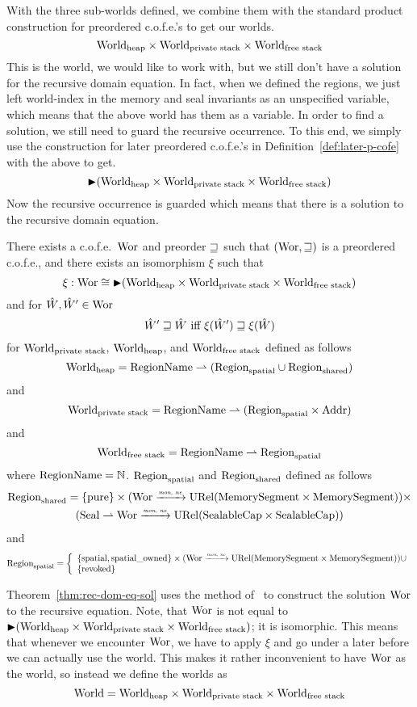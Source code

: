 \begin{jversion}
With the three sub-worlds defined, we combine them with the standard product construction for preordered c.o.f.e.'s to get our worlds.
\[
  \mathrm{World}_\mathrm{heap} \times \mathrm{World}_\text{private stack} \times \mathrm{World}_\text{free stack}
\]
This is the world, we would like to work with, but we still don't have a solution for the recursive domain equation.
In fact, when we defined the regions, we just left world-index in the memory and seal invariants as an unspecified variable, which means that the above world has them as a variable.
In order to find a solution, we still need to guard the recursive occurrence.
To this end, we simply use the construction for later preordered c.o.f.e.'s in Definition~\ref{def:later-p-cofe} with the above to get.
\[
  \mathop{\blacktriangleright} (\mathrm{World}_\mathrm{heap} \times \mathrm{World}_\text{private stack} \times \mathrm{World}_\text{free stack})
\]
Now the recursive occurrence is guarded which means that there is a solution to the recursive domain equation.
\begin{theorem}
  \label{thm:rec-dom-eq-sol}
  There exists a c.o.f.e.\ $\mathrm{Wor}$ and preorder $\sqsupseteq$ such that $(\mathrm{Wor},\sqsupseteq)$ is a preordered c.o.f.e., and there exists an isomorphism $\xi$ such that
  \[
    \xi : \mathrm{Wor} \cong \mathop{\blacktriangleright} (\mathrm{World}_\mathrm{heap} \times \mathrm{World}_\text{private stack} \times \mathrm{World}_\text{free stack})
  \]
  and for $\hat{W},\hat{W}' \in \mathrm{Wor}$
  \[
    \hat{W}' \sqsupseteq \hat{W} \text{ iff } \xi(\hat{W}') \sqsupseteq \xi(\hat{W})
  \]
  for $\mathrm{World}_\text{private stack}$, $\mathrm{World}_\mathrm{heap}$, and $\mathrm{World}_\text{free stack}$ defined as follows
\[
  \mathrm{World}_\mathrm{heap} = \mathrm{RegionName} \rightharpoonup (\mathrm{Region}_\mathrm{spatial} \cup \mathrm{Region}_\mathrm{shared})
\]
and
\[
  \mathrm{World}_\text{private stack} = \mathrm{RegionName} \rightharpoonup (\mathrm{Region}_\mathrm{spatial} \times \mathrm{Addr})
\]
and
\[
  \mathrm{World}_\text{free stack} = \mathrm{RegionName} \rightharpoonup \mathrm{Region}_\mathrm{spatial}
\]
where $\mathrm{RegionName} = \mathbb{N}$. $\mathrm{Region}_\mathrm{spatial}$ and $\mathrm{Region}_\mathrm{shared}$ defined as follows
\begin{multline*}
  \mathrm{Region}_\mathrm{shared} = 
  \{\mathrm{pure} \} \times (\mathrm{Wor} \xrightarrow{\textit{\tiny{mon, ne}}} \mathrm{URel}(\mathrm{MemorySegment}\times\mathrm{MemorySegment})) \times \\
  (\mathrm{Seal} \rightharpoonup \mathrm{Wor} \xrightarrow{\textit{\tiny{mon, ne}}} \mathrm{URel}(\mathrm{SealableCap}\times\mathrm{SealableCap}))
\end{multline*}
and
\[
  \mathrm{Region}_\mathrm{spatial} = \left\{
  \begin{array}{l}
    \{\mathrm{spatial}, \mathrm{spatial\_owned}\} \times (\mathrm{Wor} \xrightarrow{\textit{\tiny{mon, ne}}} \mathrm{URel}(\mathrm{MemorySegment}\times\mathrm{MemorySegment})) \cup\\
    \{\mathrm{revoked}\}
  \end{array} \right.
\]
\end{theorem}
Theorem~\ref{thm:rec-dom-eq-sol} uses the method of~\citet{Birkedal:2011:SKM:1926385.1926401,birkedal_taste_2014} to construct the solution $\mathrm{Wor}$ to the recursive equation.
Note, that $\mathrm{Wor}$ is not equal to $\mathop{\blacktriangleright} (\mathrm{World}_\mathrm{heap} \times \mathrm{World}_\text{private stack} \times \mathrm{World}_\text{free stack})$; it is isomorphic.
This means that whenever we encounter $\mathrm{Wor}$, we have to apply $\xi$ and go under a later before we can actually use the world.
This makes it rather inconvenient to have $\mathrm{Wor}$ as the world, so instead we define the worlds as 
\[
  \mathrm{World} = \mathrm{World}_\mathrm{heap} \times \mathrm{World}_\text{private stack} \times \mathrm{World}_\text{free stack}
\]


\end{jversion}
